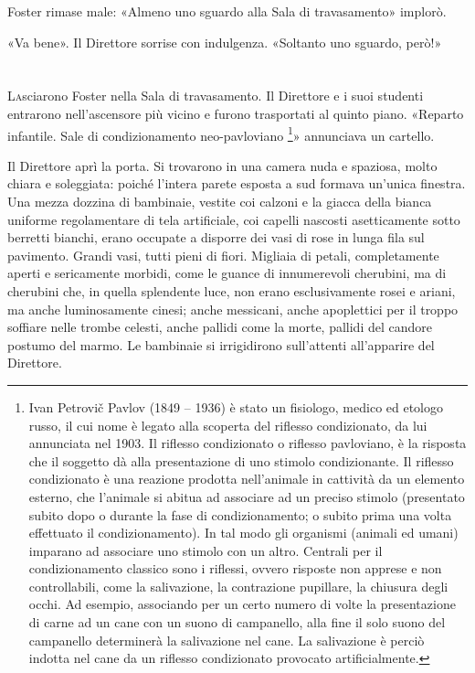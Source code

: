 \documentclass[
a5paper, %
10pt, %
twoside, 
onecolumn, %
openany, %
]{memoir}
\begin{document}
Foster rimase male: «Almeno uno sguardo alla Sala di travasamento» implorò.

«Va bene». Il Direttore sorrise con indulgenza. «Soltanto uno sguardo, però!»

\chapter{\phantom{title}}

\lettrine{L}asciarono Foster nella Sala di travasamento. Il Direttore e i suoi studenti entrarono nell’ascensore più vicino e furono trasportati al quinto piano. «Reparto infantile. Sale di condizionamento neo-pavloviano \footnote{Ivan Petrovič Pavlov (1849 – 1936) è stato un fisiologo, medico ed etologo russo, il cui nome è legato alla scoperta del riflesso condizionato, da lui annunciata nel 1903. Il riflesso condizionato o riflesso pavloviano, è la risposta che il soggetto dà alla presentazione di uno stimolo condizionante. Il riflesso condizionato è una reazione prodotta nell’animale in cattività da un elemento esterno, che l’animale si abitua ad associare ad un preciso stimolo (presentato subito dopo o durante la fase di condizionamento; o subito prima una volta effettuato il condizionamento). In tal modo gli organismi (animali ed umani) imparano ad associare uno stimolo con un altro. Centrali per il condizionamento classico sono i riflessi, ovvero risposte non apprese e non controllabili, come la salivazione, la contrazione pupillare, la chiusura degli occhi. Ad esempio, associando per un certo numero di volte la presentazione di carne ad un cane con un suono di campanello, alla fine il solo suono del campanello determinerà la salivazione nel cane. La salivazione è perciò indotta nel cane da un riflesso condizionato provocato artificialmente.}» annunciava un cartello.

Il Direttore aprì la porta. Si trovarono in una camera nuda e spaziosa, molto chiara e soleggiata: poiché l’intera parete esposta a sud formava un’unica finestra. Una mezza dozzina di bambinaie, vestite coi calzoni e la giacca della bianca uniforme regolamentare di tela artificiale, coi capelli nascosti asetticamente sotto berretti bianchi, erano occupate a disporre dei vasi di rose in lunga fila sul pavimento. Grandi vasi, tutti pieni di fiori. Migliaia di petali, completamente aperti e sericamente morbidi, come le guance di innumerevoli cherubini, ma di cherubini che, in quella splendente luce, non erano esclusivamente rosei e ariani, ma anche luminosamente cinesi; anche messicani, anche apoplettici per il troppo soffiare nelle trombe celesti, anche pallidi come la morte, pallidi del candore postumo del marmo. Le bambinaie si irrigidirono sull’attenti all’apparire del Direttore.
\end{document}
